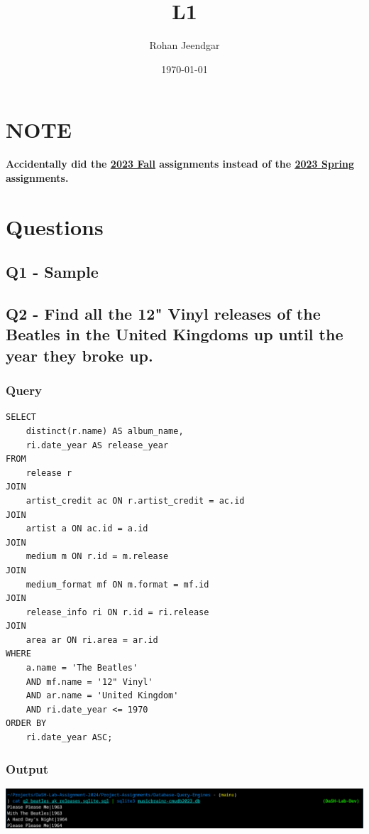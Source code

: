 \documentclass[11pt]{article}
\author{Rohan Jeendgar}
\date{\today}
\title{L1}
\begin{document}
\maketitle
\tableofcontents

\section{NOTE}
\label{sec:orga0a4ca3}
\textbf{Accidentally did the \href{https://15445.courses.cs.cmu.edu/fall2023/homework1/}{\uline{2023 Fall}} assignments instead of the \href{https://15445.courses.cs.cmu.edu/spring2023/homework1/}{\uline{2023 Spring}} assignments.}
\section{Questions}
\label{sec:org23b7a19}
\subsection{Q1 - Sample}
\label{sec:org159fca8}
\subsection{Q2 - Find all the 12" Vinyl releases of the Beatles in the United Kingdoms up until the year they broke up.}
\label{sec:org34dcc28}
\subsubsection{Query}
\label{sec:org971b29a}
\begin{verbatim}
SELECT
    distinct(r.name) AS album_name,
    ri.date_year AS release_year
FROM
    release r
JOIN
    artist_credit ac ON r.artist_credit = ac.id
JOIN
    artist a ON ac.id = a.id
JOIN
    medium m ON r.id = m.release
JOIN
    medium_format mf ON m.format = mf.id
JOIN
    release_info ri ON r.id = ri.release
JOIN
    area ar ON ri.area = ar.id
WHERE
    a.name = 'The Beatles'
    AND mf.name = '12" Vinyl'
    AND ar.name = 'United Kingdom'
    AND ri.date_year <= 1970
ORDER BY
    ri.date_year ASC;

\end{verbatim}
\subsubsection{Output}
\label{sec:orge2a650c}
\begin{center}
\includegraphics[width=.9\linewidth]{./images/Q2.png}
\end{center}
\end{document}
